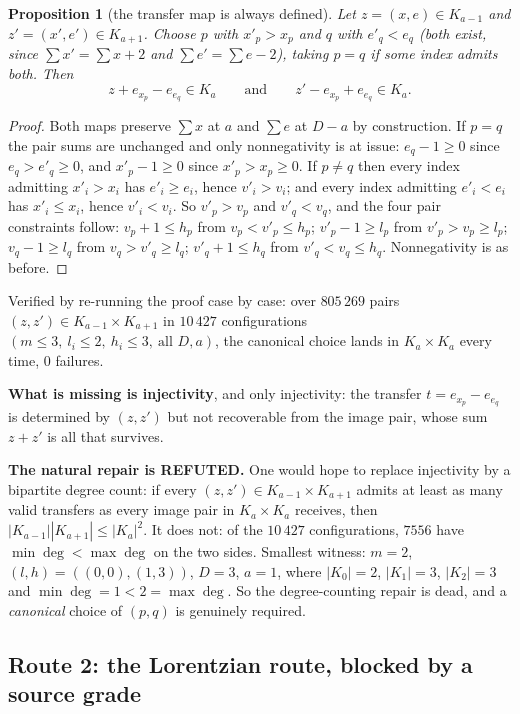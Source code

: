 \documentclass[11pt]{article}
\theoremstyle{plain}
\newtheorem{proposition}[theorem]{Proposition}
\theoremstyle{definition}
\begin{document}
\begin{proposition}[the transfer map is always defined]\label{prop:transfer}
Let $z=(x,e)\in K_{a-1}$ and $z'=(x',e')\in K_{a+1}$. Choose $p$ with $x'_p>x_p$ and $q$
with $e'_q<e_q$ (both exist, since $\sum x'=\sum x+2$ and $\sum e'=\sum e-2$), taking
$p=q$ if some index admits both. Then
\[
  z+e_{x_p}-e_{e_q}\in K_a\qquad\text{and}\qquad z'-e_{x_p}+e_{e_q}\in K_a .
\]
\end{proposition}
\begin{proof}
Both maps preserve $\sum x$ at $a$ and $\sum e$ at $D-a$ by construction. If $p=q$ the
pair sums are unchanged and only nonnegativity is at issue: $e_q-1\ge0$ since
$e_q>e'_q\ge0$, and $x'_p-1\ge0$ since $x'_p>x_p\ge0$. If $p\ne q$ then every index
admitting $x'_i>x_i$ has $e'_i\ge e_i$, hence $v'_i>v_i$; and every index admitting
$e'_i<e_i$ has $x'_i\le x_i$, hence $v'_i<v_i$. So $v'_p>v_p$ and $v'_q<v_q$, and the four
pair constraints follow: $v_p+1\le h_p$ from $v_p<v'_p\le h_p$; $v'_p-1\ge l_p$ from
$v'_p>v_p\ge l_p$; $v_q-1\ge l_q$ from $v_q>v'_q\ge l_q$; $v'_q+1\le h_q$ from
$v'_q<v_q\le h_q$. Nonnegativity is as before.
\end{proof}

Verified by re-running the proof case by case: over $805\,269$ pairs
$(z,z')\in K_{a-1}\times K_{a+1}$ in $10\,427$ configurations $(m\le3,\ l_i\le2,\ h_i\le3,
\ \text{all }D,a)$, the canonical choice lands in $K_a\times K_a$ every time, $0$ failures.

\textbf{What is missing is injectivity}, and only injectivity: the transfer
$t=e_{x_p}-e_{e_q}$ is determined by $(z,z')$ but not recoverable from the image pair,
whose sum $z+z'$ is all that survives.

\textbf{The natural repair is REFUTED.} One would hope to replace injectivity by a
bipartite degree count: if every $(z,z')\in K_{a-1}\times K_{a+1}$ admits at least as many
valid transfers as every image pair in $K_a\times K_a$ receives, then
$|K_{a-1}||K_{a+1}|\le|K_a|^2$. It does not: of the $10\,427$ configurations,
$7556$ have $\min\deg<\max\deg$ on the two sides. Smallest witness: $m=2$,
$(l,h)=((0,0),(1,3))$, $D=3$, $a=1$, where $|K_0|=2$, $|K_1|=3$, $|K_2|=3$ and
$\min\deg=1<2=\max\deg$. So the degree-counting repair is dead, and a \emph{canonical}
choice of $(p,q)$ is genuinely required.

\subsection*{Route 2: the Lorentzian route, blocked by a source grade}
\end{document}

